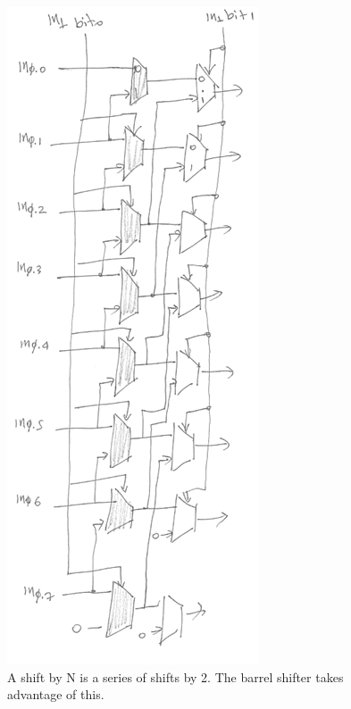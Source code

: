 \documentclass[../notes.tex]{subfiles}
\begin{document}
\begin{definition}
	\begin{figure}[H]
		\centering
		\includegraphics[width=0.8\linewidth]{img/image_2022-12-10-15-45-43.png}
		\caption{A shift by N is a series of shifts by 2. The barrel shifter takes advantage of this.}
	\end{figure}
\end{definition}
\end{document}
